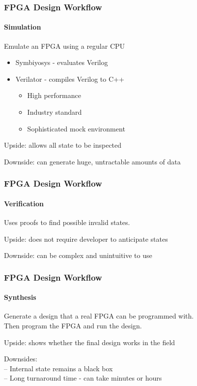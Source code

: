 \documentclass{beamer}
\begin{document}
  \begin{frame}
    \frametitle{FPGA Design Workflow}
    \framesubtitle{Simulation}

    Emulate an FPGA using a regular CPU

    \vfill

    \begin{itemize}
      \item Symbiyosys - evaluates Verilog
      \item Verilator - compiles Verilog to C++
        \begin{itemize}
          \item High performance
          \item Industry standard
          \item Sophisticated mock environment
        \end{itemize}
    \end{itemize}

    \vfill

    Upside: allows all state to be inspected

    \vfill

    Downside: can generate huge, untractable amounts of data


  \end{frame}



  \begin{frame}
    \frametitle{FPGA Design Workflow}
    \framesubtitle{Verification}

    Uses proofs to find possible invalid states.

    \vfill

    Upside: does not require developer to anticipate states

    \vfill

    Downside: can be complex and unintuitive to use


  \end{frame}

  \begin{frame}
    \frametitle{FPGA Design Workflow}
    \framesubtitle{Synthesis}

    Generate a design that a real FPGA can be programmed with. \\
    Then program the FPGA and run the design.

    \vfill

    Upside: shows whether the final design works in the field

    \vfill

    Downsides:\\ -- Internal state remains a black box\\
    -- Long turnaround time - can take minutes or hours

  \end{frame}
\end{document}
